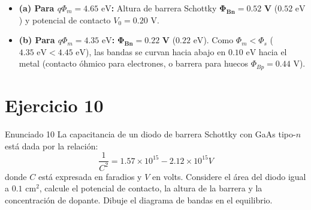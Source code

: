 \documentclass[11pt,a4paper]{article}
\begin{document}
\begin{center}
\end{center}

\begin{respuestabox}
\begin{itemize}
    \item \textbf{(a) Para $q\Phi_m = 4.65\text{ eV}$:} Altura de barrera Schottky $\mathbf{\Phi_{Bn} = 0.52\text{ V}}$ ($0.52\text{ eV}$) y potencial de contacto $V_0 = 0.20\text{ V}$.
    \item \textbf{(b) Para $q\Phi_m = 4.35\text{ eV}$:} $\mathbf{\Phi_{Bn} = 0.22\text{ V}}$ ($0.22\text{ eV}$). Como $\Phi_m < \Phi_s$ ($4.35\text{ eV} < 4.45\text{ eV}$), las bandas se curvan hacia abajo en $0.10\text{ eV}$ hacia el metal (contacto óhmico para electrones, o barrera para huecos $\Phi_{Bp} = 0.44\text{ V}$).
\end{itemize}
\end{respuestabox}

\newpage

\section*{Ejercicio 10}
\begin{ejerciciobox}{Enunciado 10}
La capacitancia de un diodo de barrera Schottky con GaAs tipo-$n$ está dada por la relación:
\[
\frac{1}{C^2} = 1.57 \times 10^{15} - 2.12 \times 10^{15} V
\]
donde $C$ está expresada en faradios y $V$ en volts. Considere el área del diodo igual a $0.1\text{ cm}^2$, calcule el potencial de contacto, la altura de la barrera y la concentración de dopante. Dibuje el diagrama de bandas en el equilibrio.
\end{ejerciciobox}
\end{document}
